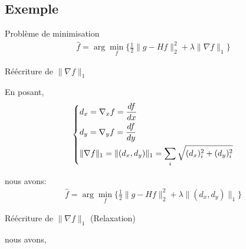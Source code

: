 \subsection{Exemple}

\frame{
    \tableofcontents[ 
        currentsubsection, 
    ]
}

\begin{frame}{Problème de minimisation}
\begin{align*}
\hat{f} = \arg\min\limits_{f} \{
    \frac{1}{2} 
    \lVert g - Hf \rVert_{2}^{2}
    + \lambda \lVert \nabla f \rVert_{1}
\} 
\end{align*}
\end{frame}

\begin{frame}{Réécriture de $\lVert \nabla f \rVert_{1}$}

En posant, \\
\begin{align*}
\begin{dcases*}
d_x = \nabla_{x}f = \frac{df}{dx} \\
d_y = \nabla_{y}f = \frac{df}{dy} \\
\lVert \nabla f \rVert_{1}
= \lVert (d_x, d_y) \rVert_{1}
= \sum\limits_{i} \sqrt{(d_x)_{i}^{2} + (d_y)_{i}^{2}} \\
\end{dcases*}
\end{align*}

nous avons: \\
\begin{align*}
\hat{f} = \arg\min\limits_{f} \{
    \frac{1}{2} 
    \lVert g - Hf \rVert_{2}^{2}
    + \lambda \lVert (d_x, d_y) \rVert_{1}
\} 
\end{align*}

\end{frame}

\begin{frame}{Réécriture de $\lVert \nabla f \rVert_{1}$ (Relaxation)}
   
nous avons, \\

\end{frame}

